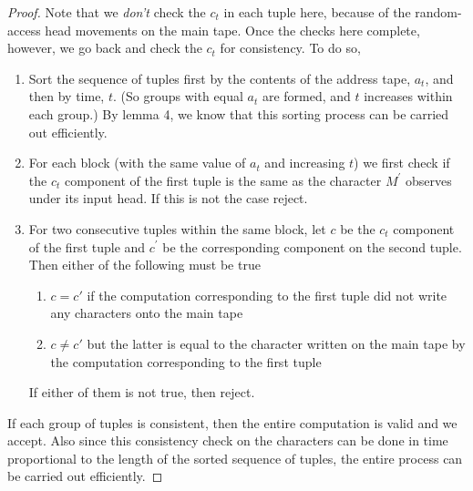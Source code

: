 \documentclass[english]{article}
\theoremstyle{plain}
\theoremstyle{definition}
\theoremstyle{plain}
\begin{document}
\begin{proof}
  Note that we \emph{don't} check the $c_{t}$ in each tuple here,
  because of the random-access head movements on the main tape. Once the
  checks here complete, however, we go back and check the $c_{t}$ for
  consistency. To do so,

  \begin{enumerate}
  \item Sort the sequence of tuples first by the contents of the
    address tape, $a_{t}$, and then by time, $t$. (So groups with
    equal $a_{t}$ are formed, and $t$ increases within each group.) By
    lemma 4, we know that this sorting process can be carried out
    efficiently.
  \item For each block (with the same value of $a_{t}$ and increasing
    $t$) we first check if the $c_t$ component of the first tuple is
    the same as the character $M^{'}$ observes under its input
    head. If this is not the case reject.
  \item For two consecutive tuples within the same block, let $c$ be
    the $c_t$ component of the first tuple and $c^{'}$ be the
    corresponding component on the second tuple. Then either of the
    following must be true
    \begin{enumerate}
    \item $c = c{'}$ if the computation corresponding to the first
      tuple did not write any characters onto the main tape
    \item $c \neq c{'}$ but the latter is equal to the character
      written on the main tape by the computation corresponding to the
      first tuple
    \end{enumerate}
    If either of them is not true, then reject.
  \end{enumerate}

  If each group of tuples is consistent, then the entire computation is
  valid and we accept. Also since this consistency check on the
  characters can be done in time proportional to the length of the
  sorted sequence of tuples, the entire process can be carried out
  efficiently.
\end{proof}



\end{document}
